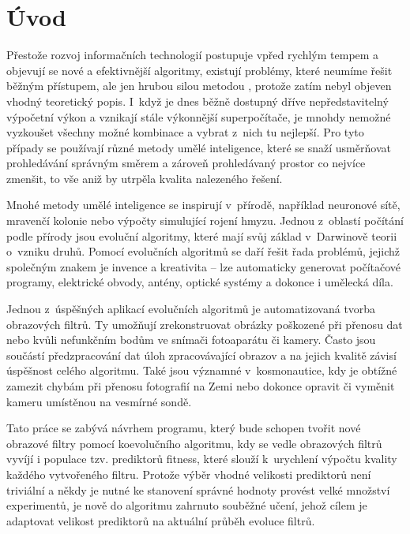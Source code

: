 
\chapter{Úvod}

Přestože rozvoj informačních technologií postupuje vpřed rychlým tempem a objevují se nové a efektivnější algoritmy, existují problémy, které neumíme řešit běžným  přístupem, ale jen hrubou silou metodou , protože zatím nebyl objeven vhodný teoretický popis. I~když je dnes běžně dostupný dříve nepředstavitelný výpočetní výkon a vznikají stále výkonnější superpočítače, je mnohdy nemožné vyzkoušet všechny možné kombinace a vybrat z~nich tu nejlepší. Pro tyto případy se používají různé metody umělé inteligence, které se snaží usměrňovat prohledávání správným směrem a zároveň prohledávaný prostor co nejvíce zmenšit, to vše aniž by utrpěla kvalita nalezeného řešení.

Mnohé metody umělé inteligence se inspirují v~přírodě, například neuronové sítě, mravenčí kolonie nebo výpočty simulující rojení hmyzu. Jednou z~oblastí počítání podle přírody jsou evoluční algoritmy, které mají svůj základ v~Darwinově teorii o~vzniku druhů. Pomocí evolučních algoritmů se daří řešit řada problémů, jejichž společným znakem je invence a kreativita -- lze automaticky generovat počítačové programy, elektrické obvody, antény, optické systémy a dokonce i umělecká díla.

Jednou z~úspěšných aplikací evolučních algoritmů je automatizovaná tvorba obrazových filtrů. Ty umožňují zrekonstruovat obrázky poškozené při přenosu dat nebo kvůli nefunkčním bodům ve snímači fotoaparátu či kamery. Často jsou součástí předzpracování dat úloh zpracovávající obrazov a na jejich kvalitě závisí úspěšnost celého algoritmu. Také jsou významné v~kosmonautice, kdy je obtížné zamezit chybám při přenosu fotografií na Zemi nebo dokonce opravit či vyměnit kameru umístěnou na vesmírné sondě.

Tato práce se zabývá návrhem programu, který bude schopen tvořit nové obrazové filtry pomocí koevolučního algoritmu, kdy se vedle obrazových filtrů vyvíjí i populace tzv. prediktorů fitness, které slouží k~urychlení výpočtu kvality každého vytvořeného filtru. Protože výběr vhodné velikosti prediktorů není triviální a někdy je nutné ke stanovení správné hodnoty provést velké množství experimentů, je nově do algoritmu zahrnuto souběžné učení, jehož cílem je adaptovat velikost prediktorů na aktuální průběh evoluce filtrů.

